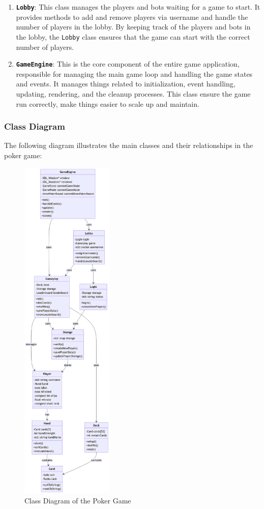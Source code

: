 \begin{enumerate}
    \item \textbf{\texttt{Lobby}}: This class manages the players and bots waiting for a game to start. It provides methods to add and remove players via username and handle the number of players in the lobby. By keeping track of the players and bots in the lobby, the \texttt{Lobby} class ensures that the game can start with the correct number of players.
    \item \textbf{\texttt{GameEngine}}: This is the core component of the entire game application, responsible for managing the main game loop and handling the game states and events. It manages things related to initialization, event handling, updating, rendering, and the cleanup processes. This class ensure the game run correctly, make things easier to scale up and maintain.
\end{enumerate}

\subsubsection{Class Diagram}
\label{subsubsec:class-diagram}
\hspace{1cm} The following diagram illustrates the main classes and their relationships in the poker game:

\begin{figure}[H]
    \centering
    \includegraphics[width=125pt]{figures/class-diagram.png}
    \caption{Class Diagram of the Poker Game}
    \label{fig:class-diagram}
\end{figure}

